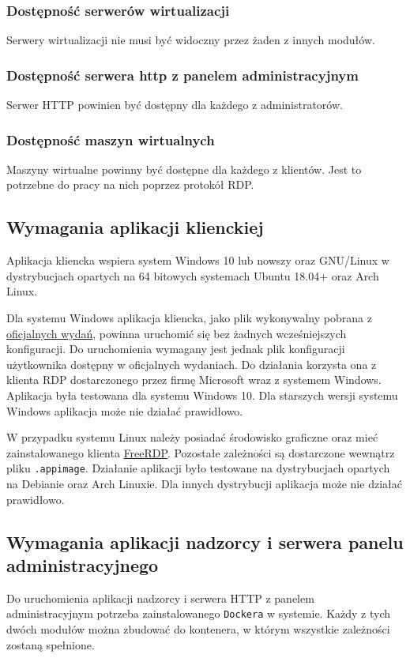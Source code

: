\documentclass[../opis-rozwiazania.tex]{subfiles}
\begin{document}
\subsubsection{Dostępność serwerów wirtualizacji}
Serwery wirtualizacji nie musi być widoczny przez żaden z innych modułów.

\subsubsection{Dostępność serwera http z panelem administracyjnym}
Serwer HTTP powinien być dostępny dla każdego z administratorów.

\subsubsection{Dostępność maszyn wirtualnych}
Maszyny wirtualne powinny być dostępne dla każdego z klientów.
Jest to potrzebne do pracy na nich poprzez protokół RDP.

\subsection{Wymagania aplikacji klienckiej}
Aplikacja kliencka wspiera system Windows 10 lub nowszy oraz GNU/Linux w dystrybucjach opartych na 64 bitowych systemach Ubuntu 18.04+ oraz Arch Linux.

Dla systemu Windows aplikacja kliencka, jako plik wykonywalny pobrana z \href{https://github.com/one-click-desktop/client/releases}{oficjalnych wydań}, powinna uruchomić się bez żadnych wcześniejszych konfiguracji. Do uruchomienia wymagany jest jednak plik konfiguracji użytkownika dostępny w oficjalnych wydaniach.
Do działania korzysta ona z klienta RDP dostarczonego przez firmę Microsoft wraz z systemem Windows.
Aplikacja była testowana dla systemu Windows 10.
Dla starszych wersji systemu Windows aplikacja może nie działać prawidłowo.

W przypadku systemu Linux należy posiadać środowisko graficzne oraz mieć zainstalowanego klienta \href{https://www.freerdp.com/}{FreeRDP}.
Pozostałe zależności są dostarczone wewnątrz pliku \texttt{.appimage}.
Działanie aplikacji było testowane na dystrybucjach opartych na Debianie oraz Arch Linuxie.
Dla innych dystrybucji aplikacja może nie działać prawidłowo.

\subsection{Wymagania aplikacji nadzorcy i serwera panelu administracyjnego}
Do uruchomienia aplikacji nadzorcy i serwera HTTP z panelem administracyjnym potrzeba zainstalowanego \texttt{Dockera} w systemie.
Każdy z tych dwóch modułów można zbudować do kontenera, w którym wszystkie zależności zostaną spełnione.
\end{document}

